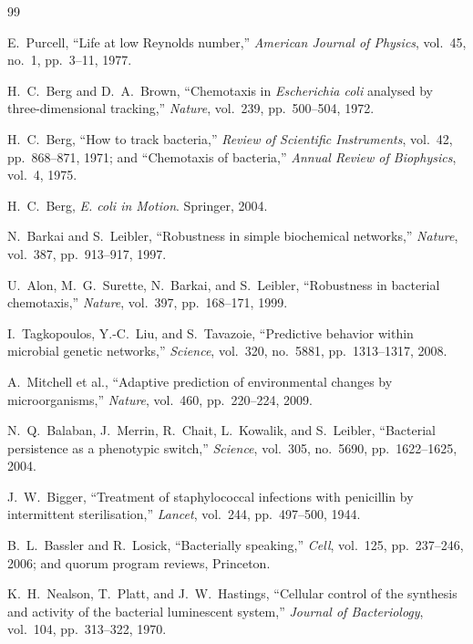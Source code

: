 \documentclass[12pt,a4paper]{article}
\begin{document}
\begin{thebibliography}{99}

E.~Purcell, ``Life at low Reynolds number,'' \emph{American Journal of Physics}, vol.~45, no.~1, pp.~3--11, 1977.

H.~C.~Berg and D.~A.~Brown, ``Chemotaxis in \emph{Escherichia coli} analysed by three-dimensional tracking,'' \emph{Nature}, vol.~239, pp.~500--504, 1972.

H.~C.~Berg, ``How to track bacteria,'' \emph{Review of Scientific Instruments}, vol.~42, pp.~868--871, 1971; and ``Chemotaxis of bacteria,'' \emph{Annual Review of Biophysics}, vol.~4, 1975.

H.~C.~Berg, \emph{E. coli in Motion}. Springer, 2004.

N.~Barkai and S.~Leibler, ``Robustness in simple biochemical networks,'' \emph{Nature}, vol.~387, pp.~913--917, 1997.

U.~Alon, M.~G.~Surette, N.~Barkai, and S.~Leibler, ``Robustness in bacterial chemotaxis,'' \emph{Nature}, vol.~397, pp.~168--171, 1999.

I.~Tagkopoulos, Y.-C.~Liu, and S.~Tavazoie, ``Predictive behavior within microbial genetic networks,'' \emph{Science}, vol.~320, no.~5881, pp.~1313--1317, 2008.

A.~Mitchell et al., ``Adaptive prediction of environmental changes by microorganisms,'' \emph{Nature}, vol.~460, pp.~220--224, 2009.

N.~Q.~Balaban, J.~Merrin, R.~Chait, L.~Kowalik, and S.~Leibler, ``Bacterial persistence as a phenotypic switch,'' \emph{Science}, vol.~305, no.~5690, pp.~1622--1625, 2004.

J.~W.~Bigger, ``Treatment of staphylococcal infections with penicillin by intermittent sterilisation,'' \emph{Lancet}, vol.~244, pp.~497--500, 1944.

B.~L.~Bassler and R.~Losick, ``Bacterially speaking,'' \emph{Cell}, vol.~125, pp.~237--246, 2006; and quorum program reviews, Princeton.

K.~H.~Nealson, T.~Platt, and J.~W.~Hastings, ``Cellular control of the synthesis and activity of the bacterial luminescent system,'' \emph{Journal of Bacteriology}, vol.~104, pp.~313--322, 1970.


\end{thebibliography}
\end{document}
